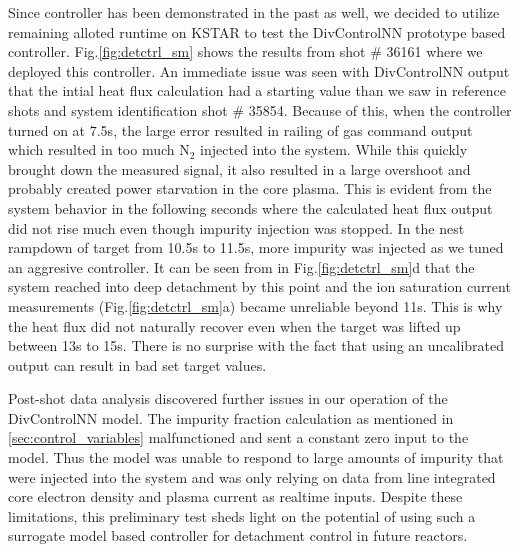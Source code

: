 Since \Afrac controller has been demonstrated in the past as well, we decided to utilize remaining alloted runtime on KSTAR to test the DivControlNN prototype based controller.
Fig.\ref{fig:detctrl_sm} shows the results from shot \# 36161 where we deployed this controller.
An immediate issue was seen with DivControlNN output that the intial heat flux calculation had a starting value than we saw in reference shots and system identification shot \# 35854.
Because of this, when the controller turned on at 7.5s, the large error resulted in railing of gas command output which resulted in too much N$_2$ injected into the system.
While this quickly brought down the measured signal, it also resulted in a large overshoot and probably created power starvation in the core plasma.
This is evident from the system behavior in the following seconds where the calculated heat flux output did not rise much even though impurity injection was stopped.
In the nest rampdown of target from 10.5s to 11.5s, more impurity was injected as we tuned an aggresive controller.
It can be seen from \Afrac in Fig.\ref{fig:detctrl_sm}d that the system reached into deep detachment by this point and the ion saturation current measurements (Fig.\ref{fig:detctrl_sm}a) became unreliable beyond 11s.
This is why the heat flux did not naturally recover even when the target was lifted up between 13s to 15s.
There is no surprise with the fact that using an uncalibrated output can result in bad set target values.

Post-shot data analysis discovered further issues in our operation of the DivControlNN model.
The impurity fraction calculation as mentioned in \ref{sec:control_variables} malfunctioned and sent a constant zero input to the model.
Thus the model was unable to respond to large amounts of impurity that were injected into the system and was only relying on data from line integrated core electron density and plasma current as realtime inputs.
Despite these limitations, this preliminary test sheds light on the potential of using such a surrogate model based controller for detachment control in future reactors.